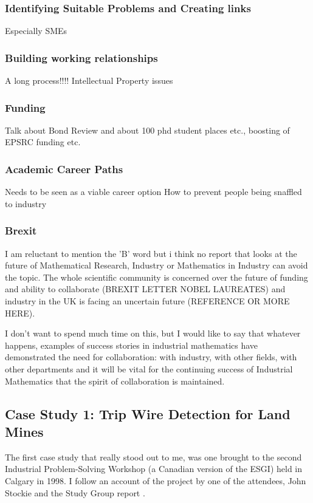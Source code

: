 \documentclass[11pt]{article} %
\begin{document}
	\subsubsection{Identifying Suitable Problems and Creating links} 
	Especially SMEs 
	\subsubsection{Building working relationships}
	A long process!!!!
	Intellectual Property issues 
	\subsubsection{Funding} 
	Talk about Bond Review and about 100 phd student places etc., boosting of EPSRC funding etc. 
	\subsubsection{Academic Career Paths} 
	Needs to be seen as a viable career option 
	How to prevent people being snaffled to industry 
	\subsubsection{Brexit}
	I am reluctant to mention the 'B' word but i think no report that looks at the future of Mathematical Research, Industry or Mathematics in Industry can avoid the topic. The whole scientific community is concerned over the future of funding and ability to collaborate (BREXIT LETTER NOBEL LAUREATES) and industry in the UK is facing an uncertain future (REFERENCE OR MORE HERE).
	
	I don't want to spend much time on this, but I would like to say that whatever happens, examples of success stories in industrial mathematics have demonstrated the need for collaboration: with industry, with other fields, with other departments and it will be vital for the continuing success of Industrial Mathematics that the spirit of collaboration is maintained. 
	
	\subsection{Case Study 1: Trip Wire Detection for Land Mines}
	
	The first case study that really stood out to me, was one brought to the second Industrial Problem-Solving Workshop (a Canadian version of the ESGI) held in Calgary in 1998. I follow an account of the project by one of the attendees, John Stockie \cite{Stockie2015} and the Study Group report \cite{Jessop}.
	
\end{document}
